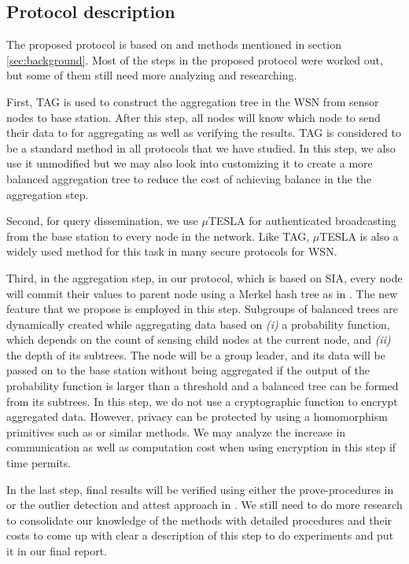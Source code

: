 \documentclass[a4paper]{article}
\begin{document}
\subsection{Protocol description}

The proposed protocol is based on \cite{Chan06} and methods mentioned
in section \ref{sec:background}. Most of the steps in the proposed protocol
were worked out, but some of them still need more analyzing and researching.

First, TAG \cite{tag} is used to construct the aggregation tree in the WSN
from sensor nodes to base station. After this step, all nodes will know which
node to send their data to for aggregating as well as verifying the
results. TAG is considered to be a standard method in all protocols that we
have studied. In this step, we also use it unmodified but we may also look
into customizing it to create a more balanced aggregation tree to reduce the
cost of achieving balance in the the aggregation step.

Second, for query dissemination, we use $\mu$TESLA \cite{SPINS} for
authenticated broadcasting from the base station to every node in the
network. Like TAG, $\mu$TESLA is also a widely used method for this task in
many secure protocols for WSN.

Third, in the aggregation step, in our protocol, which is based on SIA, every
node will commit their values to parent node using a Merkel hash tree
\cite{Merkel} as in \cite{SIA}. The new feature that we propose is employed in
this step.  Subgroups of balanced trees are dynamically created while
aggregating data based on {\it (i)} a probability function, which depends on
the count of sensing child nodes at the current node, and {\it (ii)} the depth
of its subtrees. The node will be a group leader, and its data will be passed
on to the base station without being aggregated if the output of the
probability function is larger than a threshold and a balanced tree can be
formed from its subtrees. In this step, we do not use a cryptographic function
to encrypt aggregated data. However, privacy can be protected by using a
homomorphism primitives such as \cite{Castel} or similar methods. We may
analyze the increase in communication as well as computation cost when using
encryption in this step if time permits.

In the last step, final results will be verified using either the
prove-procedures in \cite{SIA} or the outlier detection and attest approach in
\cite{SDAP}. We still need to do more research to consolidate our knowledge of
the methods with detailed procedures and their costs to come up with clear a
description of this step to do experiments and put it in our final report.
\end{document}
